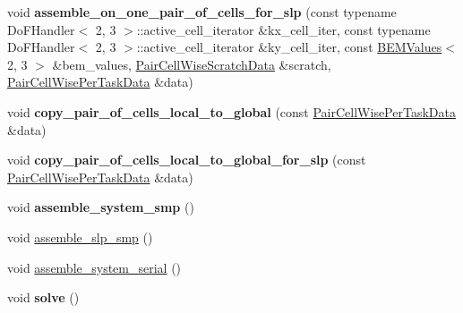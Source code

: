 \begin{DoxyCompactItemize}
\item 
\mbox{\label{classLaplaceBEM_1_1Erichsen1996Efficient_1_1Example2_a9db729e8ccddf18dc156357679ea30e8}} 
void {\bfseries assemble\+\_\+on\+\_\+one\+\_\+pair\+\_\+of\+\_\+cells\+\_\+for\+\_\+slp} (const typename Do\+F\+Handler$<$ 2, 3 $>$\+::active\+\_\+cell\+\_\+iterator \&kx\+\_\+cell\+\_\+iter, const typename Do\+F\+Handler$<$ 2, 3 $>$\+::active\+\_\+cell\+\_\+iterator \&ky\+\_\+cell\+\_\+iter, const \hyperlink{classLaplaceBEM_1_1BEMValues}{B\+E\+M\+Values}$<$ 2, 3 $>$ \&bem\+\_\+values, \hyperlink{structLaplaceBEM_1_1PairCellWiseScratchData}{Pair\+Cell\+Wise\+Scratch\+Data} \&scratch, \hyperlink{structLaplaceBEM_1_1PairCellWisePerTaskData}{Pair\+Cell\+Wise\+Per\+Task\+Data} \&data)
\item 
\mbox{\label{classLaplaceBEM_1_1Erichsen1996Efficient_1_1Example2_a8844ffa9db41c840eb02dbb6eefed24d}} 
void {\bfseries copy\+\_\+pair\+\_\+of\+\_\+cells\+\_\+local\+\_\+to\+\_\+global} (const \hyperlink{structLaplaceBEM_1_1PairCellWisePerTaskData}{Pair\+Cell\+Wise\+Per\+Task\+Data} \&data)
\item 
\mbox{\label{classLaplaceBEM_1_1Erichsen1996Efficient_1_1Example2_a7ea82599971fb83e30322affa0606f55}} 
void {\bfseries copy\+\_\+pair\+\_\+of\+\_\+cells\+\_\+local\+\_\+to\+\_\+global\+\_\+for\+\_\+slp} (const \hyperlink{structLaplaceBEM_1_1PairCellWisePerTaskData}{Pair\+Cell\+Wise\+Per\+Task\+Data} \&data)
\item 
\mbox{\label{classLaplaceBEM_1_1Erichsen1996Efficient_1_1Example2_a316947cbda2c520f03d8a703e909380f}} 
void {\bfseries assemble\+\_\+system\+\_\+smp} ()
\item 
void \hyperlink{classLaplaceBEM_1_1Erichsen1996Efficient_1_1Example2_a418130545bf95b1f331284810956d43e}{assemble\+\_\+slp\+\_\+smp} ()
\item 
void \hyperlink{classLaplaceBEM_1_1Erichsen1996Efficient_1_1Example2_a3e11e091f5fe741e19e72ad0cdc9c0c5}{assemble\+\_\+system\+\_\+serial} ()
\item 
\mbox{\label{classLaplaceBEM_1_1Erichsen1996Efficient_1_1Example2_ae9e8baae33e3e331b84969b1315f0108}} 
void {\bfseries solve} ()
\end{DoxyCompactItemize}
